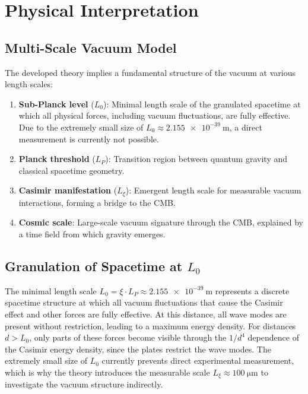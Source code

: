 	\section{Physical Interpretation}
	
	\subsection{Multi-Scale Vacuum Model}
	
	The developed theory implies a fundamental structure of the vacuum at various length scales:
	
	\begin{enumerate}
		\item \textbf{Sub-Planck level} (\( L_0 \)): Minimal length scale of the granulated spacetime at which all physical forces, including vacuum fluctuations, are fully effective. Due to the extremely small size of \( L_0 \approx \SI{2.155e-39}{\meter} \), a direct measurement is currently not possible.
		\item \textbf{Planck threshold} (\( L_P \)): Transition region between quantum gravity and classical spacetime geometry.
		\item \textbf{Casimir manifestation} (\( L_\xi \)): Emergent length scale for measurable vacuum interactions, forming a bridge to the CMB.
		\item \textbf{Cosmic scale}: Large-scale vacuum signature through the CMB, explained by a time field from which gravity emerges.
	\end{enumerate}
	
	\subsection{Granulation of Spacetime at \( L_0 \)}
	
	The minimal length scale \( L_0 = \xi \cdot L_P \approx \SI{2.155e-39}{\meter} \) represents a discrete spacetime structure at which all vacuum fluctuations that cause the Casimir effect and other forces are fully effective. At this distance, all wave modes are present without restriction, leading to a maximum energy density. For distances \( d > L_0 \), only parts of these forces become visible through the \( 1/d^4 \) dependence of the Casimir energy density, since the plates restrict the wave modes. The extremely small size of \( L_0 \) currently prevents direct experimental measurement, which is why the theory introduces the measurable scale \( L_\xi \approx \SI{100}{\micro\meter} \) to investigate the vacuum structure indirectly.
	
